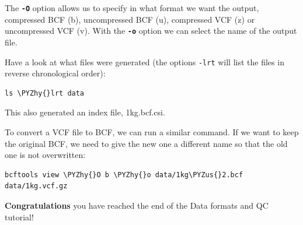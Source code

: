 \documentclass[11pt]{article}
\makeatletter
\def\PYZus{\char`\_}
\def\PYZhy{\char`\-}
\newcommand{\boxspacing}{\kern\kvtcb@left@rule\kern\kvtcb@boxsep}
\newcommand{\prompt}[4]{
        {\ttfamily\llap{{\color{blue}\LARGE\faKeyboardO\hspace{3pt}#4}}\vspace{-\baselineskip}}
    }
\makeatother
\begin{document}
    The \textbf{\texttt{-O}} option allows us to specify in what format we
want the output, compressed BCF (b), uncompressed BCF (u), compressed
VCF (z) or uncompressed VCF (v). With the \textbf{\texttt{-o}} option we
can select the name of the output file.

Have a look at what files were generated (the options \texttt{-lrt} will
list the files in reverse chronological order):

    \begin{tcolorbox}[breakable, size=fbox, boxrule=1pt, pad at break*=1mm,colback=cellbackground, colframe=cellborder]
\prompt{In}{incolor}{ }{\boxspacing}
\begin{Verbatim}[commandchars=\\\{\}]
ls \PYZhy{}lrt data
\end{Verbatim}
\end{tcolorbox}

    This also generated an index file, 1kg.bcf.csi.

    To convert a VCF file to BCF, we can run a similar command. If we want
to keep the original BCF, we need to give the new one a different name
so that the old one is not overwritten:

    \begin{tcolorbox}[breakable, size=fbox, boxrule=1pt, pad at break*=1mm,colback=cellbackground, colframe=cellborder]
\prompt{In}{incolor}{ }{\boxspacing}
\begin{Verbatim}[commandchars=\\\{\}]
bcftools view \PYZhy{}O b \PYZhy{}o data/1kg\PYZus{}2.bcf data/1kg.vcf.gz
\end{Verbatim}
\end{tcolorbox}

    \textbf{Congratulations} you have reached the end of the Data formats
and QC tutorial!


\end{document}
